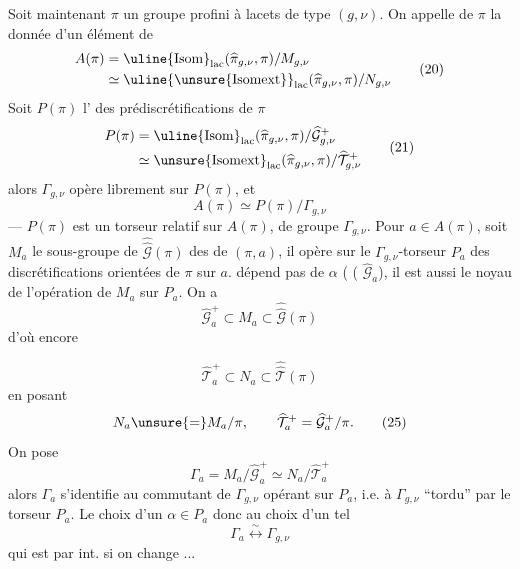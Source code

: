 Soit maintenant $\pi$ un groupe profini à lacets de type $(g,\nu)$. On appelle \uline{} de $\pi$ la donnée d'un élément de
\[
\begin{aligned}
 A(\pi)&=\uline{\mathrm{Isom}}_{\mathrm{lac}}(\widehat{\pi}_{g,\nu},\pi)/M_{g,\nu}\\
 &\simeq\uline{\unsure{\mathrm{Isomext}}}_{\mathrm{lac}}(\widehat{\pi}_{g,\nu},\pi)/N_{g,\nu}
\end{aligned}
\tag{20}
\]
Soit $P(\pi)$ l' des prédiscrétifications  de $\pi$
\[
\begin{aligned}
 P(\pi)&=\uline{\mathrm{Isom}}_{\mathrm{lac}}(\widehat{\pi}_{g,\nu},\pi)/\widehat{\mathcal G}_{g,\nu}^{+}\\
 &\simeq\unsure{\mathrm{Isomext}}_{\mathrm{lac}}(\widehat{\pi}_{g,\nu},\pi)/\widehat{\mathcal T}_{g,\nu}^{+}
\end{aligned}
\tag{21}
\]
alors $\Gamma_{g,\nu}$ opère librement  sur $P(\pi)$, et
\[
 A(\pi)\simeq P(\pi)/\Gamma_{g,\nu}
\tag{22}
\]
--- $P(\pi)$ est un torseur relatif sur $A(\pi)$, de groupe $\Gamma_{g,\nu}$. Pour $a\in A(\pi)$, soit $M_a$ le sous-groupe de $\widehat{\widehat{\mathcal G}}(\pi)$ des  de $(\pi,a)$, il opère sur le $\Gamma_{g,\nu}$-torseur $P_a$ des discrétifications orientées de $\pi$ sur $a$.
 dépend pas de $\alpha$ ( ( $\widehat{\mathcal G}_a$), il est aussi le noyau de l'opération de $M_a$ sur $P_a$. On a
\[
 \widehat{\mathcal G}_a^{+}\subset M_a\subset\widehat{\widehat{\mathcal G}}(\pi)
\tag{23}
\]
d'où encore

\[
 \widehat{\mathcal T}_a^{+}\subset N_a\subset\widehat{\widehat{\mathcal T}}(\pi)
\tag{24}
\]
en posant
\[
 N_a\unsure{=}M_a/\pi,\qquad
 \widehat{\mathcal T}_a^{+}=\widehat{\mathcal G}_a^{+}/\pi.
\tag{25}
\]
On pose
\[
 \Gamma_a=M_a/\widehat{\mathcal G}_a^{+}\simeq N_a/\widehat{\mathcal T}_a^{+}
\tag{26}
\]
alors $\Gamma_a$ s'identifie au commutant de $\Gamma_{g,\nu}$ opérant sur $P_a$, i.e. à $\Gamma_{g,\nu}$ ``tordu'' par le torseur $P_a$. Le choix d'un $\alpha\in P_a$  donc au choix d'un tel 
\[
 \Gamma_a\overset{\sim}{\longleftrightarrow}\Gamma_{g,\nu}
\tag{27}
\]
qui est  par  int. si on change ...

